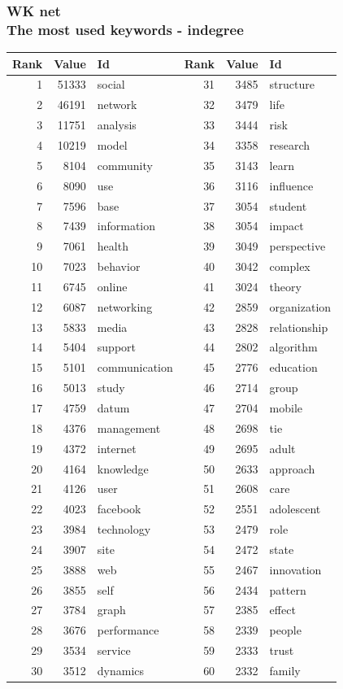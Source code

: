 \documentclass[hyperref={pdfstartview={FitBH -32768},
                         pdfpagemode=FullScreen,
                         plainpages=false,
                         colorlinks=true}
              ]{beamer}
\begin{document}
\begin{frame}[fragile]
\frametitle{WK net \\ \normalsize The most used keywords - indegree}


\renewcommand{\arraystretch}{0.82}
\tiny
\begin{center}
\begin{tabular}{r|r|l||r|r|l}
Rank&  	Value&  	Id&  	Rank&  	Value&  	Id\\ \hline
1&  	51333&  	social&  	31&  	3485&  	structure\\
2&  	46191&  	network&  	32&  	3479&  	life\\
3&  	11751&  	analysis&  	33&  	3444&  	risk\\
4&  	10219&  	model&  	34&  	3358&  	research\\
5&  	8104&  	community&  	35&  	3143&  	learn\\
6&  	8090&  	use&  	36&  	3116&  	influence\\
7&  	7596&  	base&  	37&  	3054&  	student\\
8&  	7439&  	information&  	38&  	3054&  	impact\\
9&  	7061&  	health&  	39&  	3049&  	perspective\\
10&  	7023&  	behavior&  	40&  	3042&  	complex\\
11&  	6745&  	online&  	41&  	3024&  	theory\\
12&  	6087&  	networking&  	42&  	2859&  	organization\\
13&  	5833&  	media&  	43&  	2828&  	relationship\\
14&  	5404&  	support&  	44&  	2802&  	algorithm\\
15&  	5101&  	communication&  	45&  	2776&  	education\\
16&  	5013&  	study&  	46&  	2714&  	group\\
17&  	4759&  	datum&  	47&  	2704&  	mobile\\
18&  	4376&  	management&  	48&  	2698&  	tie\\
19&  	4372&  	internet&  	49&  	2695&  	adult\\
20&  	4164&  	knowledge&  	50&  	2633&  	approach\\
21&  	4126&  	user&  	51&  	2608&  	care\\
22&  	4023&  	facebook&  	52&  	2551&  	adolescent\\
23&  	3984&  	technology&  	53&  	2479&  	role\\
24&  	3907&  	site&  	54&  	2472&  	state\\
25&  	3888&  	web&  	55&  	2467&  	innovation\\
26&  	3855&  	self&  	56&  	2434&  	pattern\\
27&  	3784&  	graph&  	57&  	2385&  	effect\\
28&  	3676&  	performance&  	58&  	2339&  	people\\
29&  	3534&  	service&  	59&  	2333&  	trust\\
30&  	3512&  	dynamics&  	60&  	2332&  	family\\ \hline
\end{tabular}
\end{center}

\end{frame}
\end{document}

